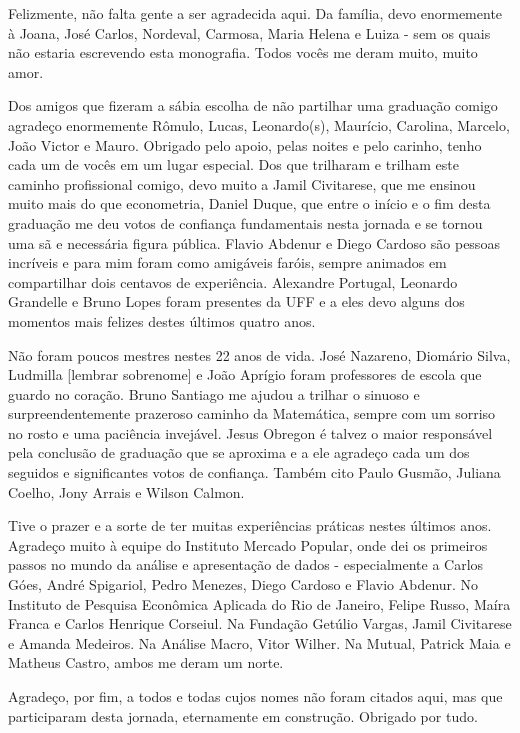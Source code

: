 
\begin{dedicatoria}
	\vspace*{\fill}
	\centering
	\noindent
	\textit{} \vspace*{\fill}
\end{dedicatoria}

\begin{agradecimentos}

Felizmente, não falta gente a ser agradecida aqui. Da família, devo enormemente à Joana, José Carlos, Nordeval, Carmosa, Maria Helena e Luiza - sem os quais não estaria escrevendo esta monografia. Todos vocês me deram muito, muito amor.

Dos amigos que fizeram a sábia escolha de não partilhar uma graduação comigo agradeço enormemente Rômulo, Lucas, Leonardo(s), Maurício, Carolina, Marcelo, João Victor e Mauro. Obrigado pelo apoio, pelas noites e pelo carinho, tenho cada um de vocês em um lugar especial. Dos que trilharam e trilham este caminho profissional comigo, devo muito a Jamil Civitarese, que me ensinou muito mais do que econometria, Daniel Duque, que entre o início e o fim desta graduação me deu votos de confiança fundamentais nesta jornada e se tornou uma sã e necessária figura pública. Flavio Abdenur e Diego Cardoso são pessoas incríveis e para mim foram como amigáveis faróis, sempre animados em compartilhar dois centavos de experiência. Alexandre Portugal, Leonardo Grandelle e Bruno Lopes foram presentes da UFF e a eles devo alguns dos momentos mais felizes destes últimos quatro anos.

Não foram poucos mestres nestes 22 anos de vida. José Nazareno, Diomário Silva, Ludmilla [lembrar sobrenome] e João Aprígio foram professores de escola que guardo no coração. Bruno Santiago me ajudou a trilhar o sinuoso e surpreendentemente prazeroso caminho da Matemática, sempre com um sorriso no rosto e uma paciência invejável. Jesus Obregon é talvez o maior responsável pela conclusão de graduação que se aproxima e a ele agradeço cada um dos seguidos e significantes votos de confiança. Também cito Paulo Gusmão, Juliana Coelho, Jony Arrais e Wilson Calmon.

Tive o prazer e a sorte de ter muitas experiências práticas nestes últimos anos. Agradeço muito à equipe do Instituto Mercado Popular, onde dei os primeiros passos no mundo da análise e apresentação de dados - especialmente a Carlos Góes, André Spigariol, Pedro Menezes, Diego Cardoso e Flavio Abdenur. No Instituto de Pesquisa Econômica Aplicada do Rio de Janeiro, Felipe Russo, Maíra Franca e Carlos Henrique Corseiul. Na Fundação Getúlio Vargas, Jamil Civitarese e Amanda Medeiros. Na Análise Macro, Vitor Wilher. Na Mutual, Patrick Maia e Matheus Castro, ambos me deram um norte. 

Agradeço, por fim, a todos e todas cujos nomes não foram citados aqui, mas que participaram desta jornada, eternamente em construção. Obrigado por tudo. 


\end{agradecimentos}